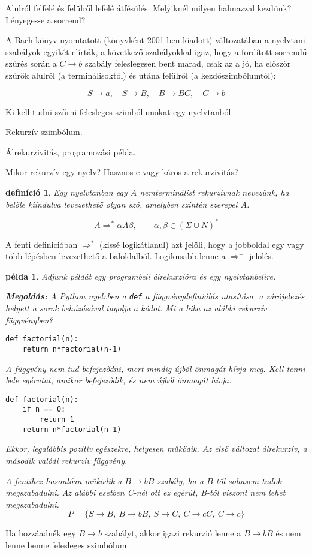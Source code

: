 \documentclass[a4paper]{article}
\newtheorem{pelda}{példa}[section]
\newtheorem{definicio}{definíció}[section]
\begin{document}
Alulról felfelé és felülről lefelé átfésülés.
Melyiknél milyen halmazzal kezdünk? Lényeges-e a sorrend?

A Bach-könyv nyomtatott (könyvként 2001-ben kiadott) változatában a nyelvtani
szabályok egyikét elírták, a következő szabályokkal igaz, hogy a
fordított sorrendű szűrés során a $C\to b$ szabály feleslegesen
bent marad, csak az a jó, ha először szűrök alulról (a terminálisoktól)
és utána felülről (a kezdőszimbólumtól):

\[S\to a,\quad S\to B,\quad B\to BC,\quad C\to b\]

Ki kell tudni szűrni felesleges szimbólumokat egy nyelvtanból.

Rekurzív szimbólum.

Álrekurzivitás, programozási példa.

Mikor rekurzív egy nyelv? Hasznos-e vagy káros a rekurzivitás?

\vspace{2em}

\begin{definicio}
    Egy nyelvtanban egy $A$ nemterminálist rekurzívnak nevezünk, ha belőle
    kiindulva levezethető olyan szó, amelyben szintén szerepel $A$.

    \[A \Rightarrow^* \alpha A \beta,
    \qquad \alpha, \beta \in (\Sigma \cup N)^*\]
\end{definicio}

A fenti definicióban $\Rightarrow^*$ (kissé logikátlanul) azt jelöli,
hogy a jobboldal egy vagy több lépésben levezethető a baloldalból.
Logikusabb lenne a $\Rightarrow^+$ jelölés.

\begin{pelda}
Adjunk példát egy programbeli álrekurzióra és egy nyelvtanbelire.

\textbf{Megoldás:}
A Python nyelvben a \verb|def| a függvénydefiniálás utasítása, a
zárójelezés helyett a sorok behúzásával tagolja a kódot. Mi a hiba
az alábbi rekurzív függvényben?

\begin{verbatim}
def factorial(n):
    return n*factorial(n-1)
\end{verbatim}

A függvény nem tud befejeződni, mert mindig újból önmagát hívja meg.
Kell tenni bele egérutat, amikor befejeződik, és nem újból önmagát
hívja:

\begin{verbatim}
def factorial(n):
    if n == 0:
        return 1
    return n*factorial(n-1)
\end{verbatim}

Ekkor, legalábbis pozitív egészekre, helyesen működik. Az első változat
álrekurzív, a második valódi rekurzív függvény.

A fentihez hasonlóan működik a $B\to bB$ szabály, ha a $B$-től sohasem
tudok megszabadulni. Az alábbi esetben C-nél ott ez egérút, B-től
viszont nem lehet megszabadulni.
\[P=\{ S \to B,\: B\to bB ,\: S\to C,\: C\to cC,\: C\to c\}\]
\end{pelda}
\vspace{2em}
Ha hozzáadnék egy $B\to b$ szabályt, akkor igazi rekurzió lenne a $B\to
bB$ és nem lenne benne felesleges szimbólum.
\end{document}
